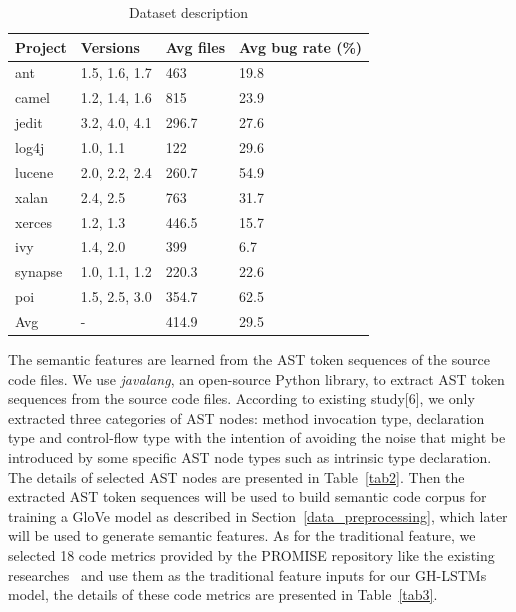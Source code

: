 \documentclass[journal]{IEEEtran}
\begin{document}
\begin{table}[htbp]
	\footnotesize
	\caption{Dataset description}
	\label{tab1}
	\tabcolsep 11pt
	\centering
	\begin{tabular}{llll}
		\toprule
		Project & Versions & Avg files & Avg bug rate (\%) \\\midrule
		ant     & 1.5, 1.6, 1.7 & 463    & 19.8\\
		camel   & 1.2, 1.4, 1.6 & 815    & 23.9\\
		jedit   & 3.2, 4.0, 4.1 & 296.7  & 27.6\\
		log4j   & 1.0, 1.1      & 122    & 29.6\\
		lucene  & 2.0, 2.2, 2.4 & 260.7  & 54.9\\
		xalan   & 2.4, 2.5      & 763    & 31.7\\
		xerces  & 1.2, 1.3      & 446.5  & 15.7\\
		ivy     & 1.4, 2.0      & 399    & 6.7 \\
		synapse & 1.0, 1.1, 1.2 & 220.3  & 22.6\\
		poi     & 1.5, 2.5, 3.0 & 354.7  & 62.5\\
		Avg     & -             & 414.9  & 29.5\\
		\bottomrule
	\end{tabular}
\end{table}
The semantic features are learned from the AST token sequences of the source code files. We use \textit{javalang}, an open-source Python library, to extract AST token sequences from the source code files. According to existing study[6], we only extracted three categories of AST nodes: method invocation type, declaration type and control-flow type with the intention of avoiding the noise that might be introduced by some specific AST node types such as intrinsic type declaration. The details of selected AST nodes are presented in Table~\ref{tab2}. Then the extracted AST token sequences will be used to build semantic code corpus for training a GloVe model as described in Section~\ref{data_preprocessing}, which later will be used to generate semantic features. As for the traditional feature, we selected 18 code metrics provided by the PROMISE repository like the existing researches~\cite{wang2018deep,fan2019deep} and use them as the traditional feature inputs for our GH-LSTMs model, the details of these code metrics are presented in Table~\ref{tab3}.
\end{document}
